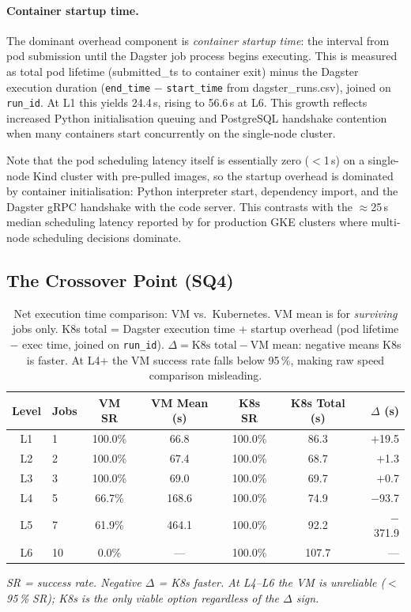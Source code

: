 \paragraph{Container startup time.}
The dominant overhead component is \emph{container startup time}: the interval from pod submission until the Dagster job process begins executing.
This is measured as total pod lifetime (submitted\_ts to container exit) minus the Dagster execution duration (\texttt{end\_time} $-$ \texttt{start\_time} from dagster\_runs.csv), joined on \texttt{run\_id}.
At L1 this yields 24.4\,s, rising to 56.6\,s at L6.
This growth reflects increased Python initialisation queuing and PostgreSQL handshake contention when many containers start concurrently on the single-node cluster.

Note that the pod scheduling latency itself is essentially zero ($<$1\,s) on a single-node Kind cluster with pre-pulled images, so the startup overhead is dominated by container initialisation: Python interpreter start, dependency import, and the Dagster gRPC handshake with the code server.
This contrasts with the $\approx$25\,s median scheduling latency reported by \citet{choi2021} for production GKE clusters where multi-node scheduling decisions dominate.

\subsection{The Crossover Point (SQ4)}
\label{subsec:results-crossover}

\begin{table}[H]
  \centering
  \caption{Net execution time comparison: VM vs.\ Kubernetes.
  VM mean is for \emph{surviving} jobs only.
  K8s total = Dagster execution time + startup overhead (pod lifetime $-$ exec time, joined on \texttt{run\_id}).
  $\Delta = \text{K8s total} - \text{VM mean}$: negative means K8s is faster.
  At L4+ the VM success rate falls below 95\,\%, making raw speed comparison misleading.}
  \label{tab:crossover}
  \small
  \begin{tabular}{clcccc r}
    \toprule
    \textbf{Level} & \textbf{Jobs} & \textbf{VM SR} & \textbf{VM Mean (s)} & \textbf{K8s SR} & \textbf{K8s Total (s)} & \textbf{$\Delta$ (s)} \\
    \midrule
    L1  &  1 & 100.0\% & 66.8 & 100.0\% & 86.3 & $+$19.5 \\
    L2  &  2 & 100.0\% & 67.4 & 100.0\% & 68.7 & $+$1.3 \\
    L3  &  3 & 100.0\% & 69.0 & 100.0\% & 69.7 & $+$0.7 \\
    L4  &  5 &  66.7\% &168.6 & 100.0\% & 74.9 & $-$93.7 \\
    L5  &  7 &  61.9\% &464.1 & 100.0\% & 92.2 & $-$371.9 \\
    L6  & 10 &   0.0\% &  --- & 100.0\% & 107.7 & --- \\
    \bottomrule
  \end{tabular}
  \par\smallskip
  \footnotesize\textit{SR = success rate. Negative $\Delta$ = K8s faster. At L4--L6 the VM is unreliable ($<$95\,\% SR); K8s is the only viable option regardless of the $\Delta$ sign.}
\end{table}

